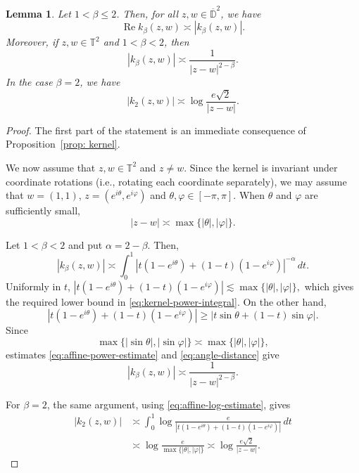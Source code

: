 \documentclass[a4paper,12pt]{amsart}
\newtheorem{lem}[thm]{Lemma}
\theoremstyle{definition}
\def\D{\mathbb D}
\begin{document}
\begin{lem}\label{lem:kernel-estimates}
    Let $1<\beta\leq 2$. Then, for all $z,w\in \overline{\D}^2$, we have
    \begin{equation*}
        \operatorname{Re} k_\beta(z,w) \asymp |k_\beta(z,w)|.
    \end{equation*}
    Moreover, if $z,w\in \mathbb{T}^2$ and $1<\beta<2$, then
    \begin{equation*}
        |k_\beta(z,w)| \asymp \frac{1}{|z-w|^{2-\beta}}.
    \end{equation*}
    In the case $\beta=2$, we have
    \begin{equation*}
        |k_2(z,w)| \asymp \log \frac{e \sqrt{2}}{|z-w|}.
    \end{equation*}
\end{lem}
\begin{proof}
    The first part of the statement is an immediate consequence of Proposition~\ref{prop: kernel}. 

        We now assume that \(z,w\in\mathbb T^2\) and \(z\neq w\).
    Since the kernel is invariant under coordinate rotations (i.e., rotating each coordinate separately), we may
    assume that
    $w=(1,1)$, $z=(e^{i\theta},e^{i\varphi})$ and $\theta,\varphi\in[-\pi,\pi].$    When \(\theta\) and \(\varphi\) are sufficiently small,
    \begin{equation}
        |z-w|\asymp \max\{|\theta|,|\varphi|\}.
        \label{eq:angle-distance}
    \end{equation}

    Let \(1<\beta<2\) and put \(\alpha=2-\beta\). Then,
    \begin{equation}
        |k_\beta(z,w)|
        \asymp
        \int_0^1
        \left|
            t(1-e^{i\theta})+(1-t)(1-e^{i\varphi})
        \right|^{-\alpha}\,dt.
        \label{eq:kernel-power-integral}
    \end{equation}
    Uniformly in \(t\),
    $
        \left|
            t(1-e^{i\theta})+(1-t)(1-e^{i\varphi})
        \right|
        \lesssim\max\{|\theta|,|\varphi|\},
    $
    which gives the required lower bound in
    \eqref{eq:kernel-power-integral}. On the other hand,
    \[
        \left|
            t(1-e^{i\theta})+(1-t)(1-e^{i\varphi})
        \right|
        \geq
        |t\sin\theta+(1-t)\sin\varphi|.
    \]
    Since
    \[
        \max\{|\sin\theta|,|\sin\varphi|\}
        \asymp\max\{|\theta|,|\varphi|\},
    \]
    estimates \eqref{eq:affine-power-estimate} and
    \eqref{eq:angle-distance} give
    \[
        |k_\beta(z,w)|
        \asymp
        \frac{1}{|z-w|^{2-\beta}}.
    \]

    For \(\beta=2\), the same
    argument, using \eqref{eq:affine-log-estimate}, gives
    \[
    \begin{aligned}
        |k_2(z,w)|
        &\asymp
        \int_0^1
        \log\frac{e}{
        \left|t(1-e^{i\theta})+(1-t)(1-e^{i\varphi})\right|}
        \,dt \\
        &\asymp
        \log\frac{e}{\max\{|\theta|,|\varphi|\}}
        \asymp
        \log\frac{e\sqrt2}{|z-w|}.
    \end{aligned}
    \]
\end{proof}
\end{document}

